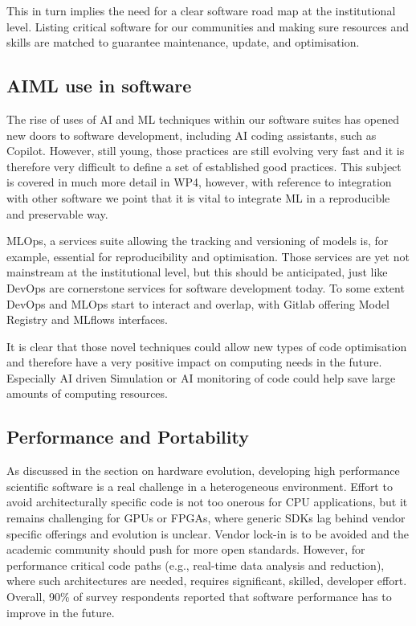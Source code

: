 This in turn implies the need for a clear software road map at the institutional level. Listing critical software for our communities and making sure resources and skills are matched to guarantee maintenance, update, and optimisation.

\subsection{AI\/ML use in software}

The rise of uses of AI and ML techniques within our software suites has opened new doors to software development, including AI coding assistants, such as Copilot. However, still young, those practices are still evolving very fast and it is therefore very difficult to define a set of established good practices. This subject is covered in much more detail in WP4, however, with reference to integration with other software we point that it is vital to integrate ML in a reproducible and preservable way.

MLOps, a services suite allowing the tracking and versioning of models is, for example, essential for reproducibility and optimisation. Those services are yet not mainstream at the institutional level, but this should be anticipated, just like DevOps are cornerstone services for software development today. To some extent DevOps and MLOps start to interact and overlap, with Gitlab offering Model Registry and MLflows interfaces.

It is clear that those novel techniques could allow new types of code optimisation and therefore have a very positive impact on computing needs in the future. Especially AI driven Simulation or AI monitoring of code could help save large amounts of computing resources.


\subsection{Performance and Portability}

As discussed in the section on hardware evolution, developing high performance scientific software is a real challenge in a heterogeneous environment. Effort to avoid architecturally specific code is not too onerous for CPU applications, but it remains challenging for GPUs or FPGAs, where generic SDKs lag behind vendor specific offerings and evolution is unclear. Vendor lock-in is to be avoided and the academic community should push for more open standards. However, for performance critical code paths (e.g., real-time data analysis and reduction), where such architectures are needed, requires significant, skilled, developer effort. Overall, 90\% of survey respondents reported that software performance has to improve in the future.

